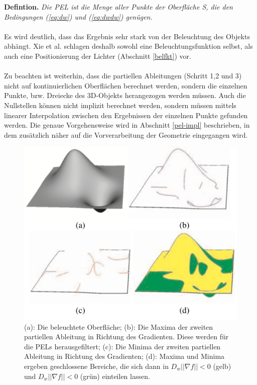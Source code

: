 \documentclass{paperStyle}
\begin{document}
\textbf{Defintion.} \emph{Die PEL ist die Menge aller Punkte der Oberfläche S, die den Bedingungen (\ref{eq:dw}) und (\ref{eq:dwdw}) genügen.}\cite{Xie2007}
\\\\
Es wird deutlich, dass das Ergebnis sehr stark von der Beleuchtung des Objekts abhängt. Xie et al. schlagen deshalb sowohl eine Beleuchtungsfunktion selbst, als auch eine Positionierung der Lichter (Abschnitt \ref{belfkt}) vor.\\\\
Zu beachten ist weiterhin, dass die partiellen Ableitungen (Schritt 1,2 und 3) nicht auf kontinuierlichen Oberflächen berechnet werden, sondern die einzelnen Punkte, bzw. Dreiecke des 3D-Objekts herangezogen werden müssen. Auch die Nullstellen können nicht implizit berechnet werden, sondern müssen mittels linearer Interpolation zwischen den Ergebnissen der einzelnen Punkte gefunden werden. Die genaue Vorgehensweise wird in Abschnitt \ref{pel-impl} beschrieben, in dem zusätzlich näher auf die Vorverarbeitung der Geometrie eingegangen wird.
\begin{figure}
	\centering
		\includegraphics[width=0.7\linewidth]{abcd.png}
	\caption{(a): Die beleuchtete Oberfläche; (b): Die Maxima der zweiten partiellen Ableitung in Richtung des Gradienten. Diese werden für die PELs herausgefiltert; (c): Die Minima der zweiten partiellen Ableitung in Richtung des Gradienten; (d): Maxima und Minima ergeben geschlossene Bereiche, die sich dann in $D_{w}||\nabla f || < 0$ (gelb) und $D_{w}||\nabla f || < 0$ (grün) einteilen lassen. \cite{Xie2007}}
	\label{fig:abcd}
\end{figure}
\end{document}
